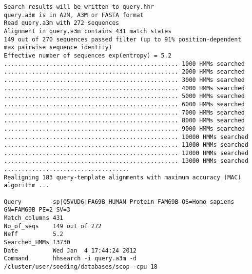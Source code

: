 \documentclass[11pt,a4paper]{article}
\begin{document}
\scriptsize
\begin{verbatim}
Search results will be written to query.hhr
query.a3m is in A2M, A3M or FASTA format
Read query.a3m with 272 sequences
Alignment in query.a3m contains 431 match states
149 out of 270 sequences passed filter (up to 91% position-dependent max pairwise sequence identity)
Effective number of sequences exp(entropy) = 5.2 
.................................................. 1000 HMMs searched
.................................................. 2000 HMMs searched
.................................................. 3000 HMMs searched
.................................................. 4000 HMMs searched
.................................................. 5000 HMMs searched
.................................................. 6000 HMMs searched
.................................................. 7000 HMMs searched
.................................................. 8000 HMMs searched
.................................................. 9000 HMMs searched
.................................................. 10000 HMMs searched
.................................................. 11000 HMMs searched
.................................................. 12000 HMMs searched
.................................................. 13000 HMMs searched
....................................
Realigning 183 query-template alignments with maximum accuracy (MAC) algorithm ...

Query         sp|Q5VUD6|FA69B_HUMAN Protein FAM69B OS=Homo sapiens GN=FAM69B PE=2 SV=3
Match_columns 431
No_of_seqs    149 out of 272
Neff          5.2 
Searched_HMMs 13730
Date          Wed Jan  4 17:44:24 2012
Command       hhsearch -i query.a3m -d /cluster/user/soeding/databases/scop -cpu 18 


\end{verbatim}
\end{document}
